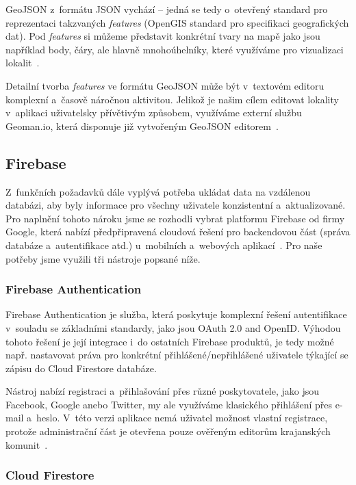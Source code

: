GeoJSON z~formátu JSON vychází -- jedná se tedy o~otevřený standard pro reprezentaci takzvaných \emph{features} (OpenGIS standard pro specifikaci geografických dat). Pod \emph{features} si můžeme představit konkrétní tvary na mapě jako jsou například body, čáry, ale hlavně mnohoúhelníky, které využíváme pro vizualizaci lokalit~\parencite{geojson}.

Detailní tvorba \emph{features} ve formátu GeoJSON může být v~textovém editoru komplexní a~časově náročnou aktivitou. Jelikož je našim cílem editovat lokality v~aplikaci uživatelsky přívětivým způsobem, využíváme externí službu Geoman.io, která disponuje již vytvořeným GeoJSON editorem~\parencite{geoman}.

\hypertarget{firebase}{%
\subsection{Firebase}\label{firebase}}

Z~funkčních požadavků dále vyplývá potřeba ukládat data na vzdálenou databázi, aby byly informace pro všechny uživatele konzistentní a~aktualizované. Pro naplnění tohoto nároku jsme se rozhodli vybrat platformu Firebase od firmy Google, která nabízí předpřipravená cloudová řešení pro backendovou část (správa databáze a~autentifikace atd.) u~mobilních a~webových aplikací~\parencite{firebase}. Pro naše potřeby jsme využili tři nástroje popsané níže.

\hypertarget{firebase-authentication}{%
\subsubsection{Firebase Authentication}\label{firebase-authentication}}

Firebase Authentication je služba, která poskytuje komplexní řešení autentifikace v~souladu se základními standardy, jako jsou OAuth 2.0 and OpenID. Výhodou tohoto řešení je její integrace i~do ostatních Firebase produktů, je tedy možné např. nastavovat práva pro konkrétní přihlášené/nepřihlášené uživatele týkající se zápisu do Cloud Firestore databáze.

Nástroj nabízí registraci a~přihlašování přes různé poskytovatele, jako jsou Facebook, Google anebo Twitter, my ale využíváme klasického přihlášení přes e-mail a~heslo. V~této verzi aplikace nemá uživatel možnost vlastní registrace, protože administrační část je otevřena pouze ověřeným editorům krajanských komunit~\parencite{auth}.

\hypertarget{cloud-firestore}{%
\subsubsection{Cloud Firestore}\label{cloud-firestore}}

